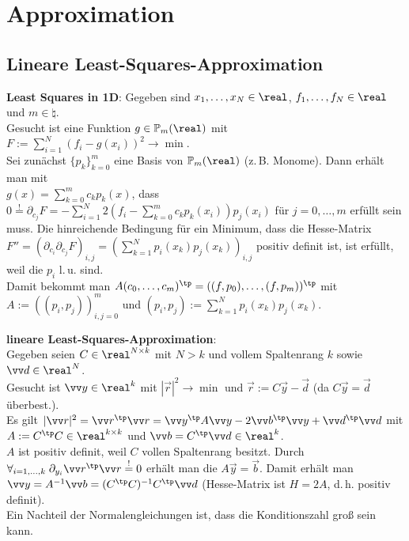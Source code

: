 \section{%
    Approximation%
}

\subsection{%
    Lineare Least-Squares-Approximation%
}

\textbf{Least Squares in 1D}:
Gegeben sind $x_1, \dotsc, x_N \in \real$, $f_1, \dotsc, f_N \in \real$ und $m \in \natural$.\\
Gesucht ist eine Funktion $g \in \PP_m(\real)$ mit
$F := \sum_{i=1}^N (f_i - g(x_i))^2 \to \min$.\\
Sei zunächst $\{p_k\}_{k=0}^m$ eine Basis von $\PP_m(\real)$ (z.\,B. Monome).
Dann erhält man mit\\
$g(x) = \sum_{k=0}^m c_k p_k(x)$, dass
$0 \overset{!}{=} \partial_{c_j} F = -\sum_{i=1}^N 2(f_i - \sum_{k=0}^m c_k p_k(x_i)) p_j(x_i)$
für $j = 0, \dotsc, m$
erfüllt sein muss.
Die hinreichende Bedingung für ein Minimum, dass die Hesse-Matrix\\
$F'' = (\partial_{c_i} \partial_{c_j} F)_{i,j}
= (\sum_{k=1}^N p_i(x_k) p_j(x_k))_{i,j}$ positiv definit ist,
ist erfüllt, weil die $p_i$ l.\,u. sind.\\
Damit bekommt man
$A (c_0, \dotsc, c_m)^\tp = ((f, p_0), \dotsc, (f, p_m))^\tp$
mit $A := ((p_i, p_j))_{i,j=0}^m$ und $(p_i, p_j) := \sum_{k=1}^N p_i(x_k) p_j(x_k)$.

\linie

\textbf{lineare Least-Squares-Approximation}:\\
Gegeben seien $C \in \real^{N \times k}$ mit $N > k$ und vollem Spaltenrang $k$ sowie
$\vec{d} \in \real^N$.\\
Gesucht ist $\vec{y} \in \real^k$ mit $|\vec{r}|^2 \to \min$ und
 $\vec{r} := C\vec{y} - \vec{d}$
(da $C\vec{y} = \vec{d}$ überbest.).\\
Es gilt
$|\vec{r}|^2
= \vec{r}^\tp \vec{r}
= \vec{y}^\tp A \vec{y} - 2\vec{b}^\tp \vec{y} + \vec{d}^\tp \vec{d}$
mit $A := C^\tp C \in \real^{k \times k}$ und $\vec{b} = C^\tp \vec{d} \in \real^k$.\\
$A$ ist positiv definit, weil $C$ vollen Spaltenrang besitzt.
Durch $\forall_{i=1,\dotsc,k}\; \partial_{y_i} \vec{r}^\tp \vec{r} \overset{!}{=} 0$
erhält man die  $A\vec{y} = \vec{b}$.
Damit erhält man $\vec{y} = A^{-1} \vec{b} = (C^\tp C)^{-1} C^\tp \vec{d}$
(Hesse-Matrix ist $H = 2A$, d.\,h. positiv definit).\\
Ein Nachteil der Normalengleichungen ist, dass die Konditionszahl groß sein kann.

